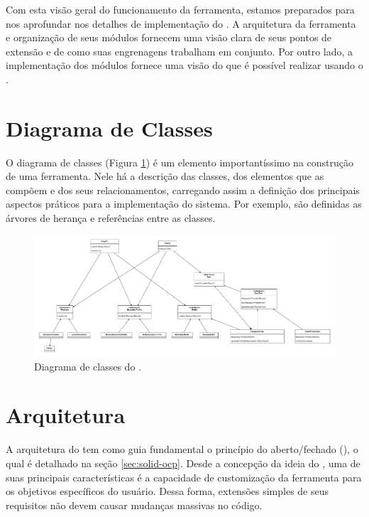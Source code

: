 \documentclass[12pt]{tcc}
\begin{document}
	Com esta visão geral do funcionamento da ferramenta, estamos preparados para nos aprofundar nos detalhes de implementação do .
	A arquitetura da ferramenta e organização de seus módulos fornecem uma visão clara de seus pontos de extensão e de como suas engrenagens trabalham em conjunto.
	Por outro lado, a implementação dos módulos fornece uma visão do que é possível realizar usando o .


	\section{Diagrama de Classes}
	\label{sec:diagrama_de_classe}


	O diagrama de classes (Figura \ref{fig:diag-classes}) é um elemento importantíssimo na construção de uma ferramenta.
	Nele há a descrição das classes, dos elementos que as compõem e dos seus relacionamentos, carregando assim a definição dos principais aspectos práticos para a implementação do sistema.
	Por exemplo, são definidas as árvores de herança e referências entre as classes.

	\begin{figure}[!ht]
		\centering
		\includegraphics[width=\textwidth]{figures/diagrama-classes.pdf}
		\caption[Diagrama de Classes]{Diagrama de classes do .}
		\label{fig:diag-classes}
	\end{figure}


	\section{Arquitetura}
	\label{sec:arquitetura}

	A arquitetura do  tem como guia fundamental o princípio do aberto/fechado (), o qual é detalhado na seção \ref{sec:solid-ocp}.
	Desde a concepção da ideia do , uma de suas principais características é a capacidade de customização da ferramenta para os objetivos específicos do usuário.
	Dessa forma, extensões simples de seus requisitos não devem causar mudanças massivas no código.
\end{document}
